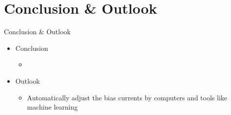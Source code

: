 \section{Conclusion \& Outlook}

\begin{frame}{Conclusion \& Outlook}
\begin{itemize}
    \item Conclusion\vspace{5pt}
    \begin{itemize}
        \item \lipsum[66]
    \end{itemize}
    \vspace{10pt}
    \item Outlook\vspace{5pt}
    \begin{itemize}
        \item Automatically adjust the bias currents by computers and tools like machine learning\cite{machineLearning}\vspace{4pt}
    \end{itemize}
\end{itemize}
\end{frame}